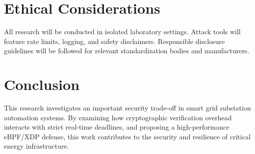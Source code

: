 \documentclass[12pt,a4paper]{article}
\begin{document}
\section{Ethical Considerations}

All research will be conducted in isolated laboratory settings. Attack tools will feature rate limits, logging, and safety disclaimers. Responsible disclosure guidelines will be followed for relevant standardization bodies and manufacturers.

\section{Conclusion}

This research investigates an important security trade-off in smart grid substation automation systems. By examining how cryptographic verification overhead interacts with strict real-time deadlines, and proposing a high-performance eBPF/XDP defense, this work contributes to the security and resilience of critical energy infrastructure.
\end{document}

